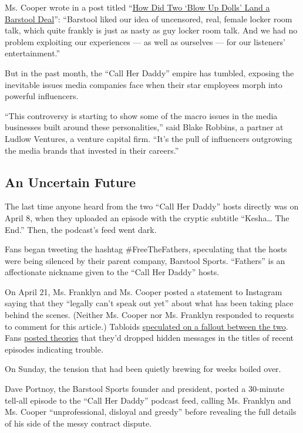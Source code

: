 Ms. Cooper wrote in a post titled
``\href{https://www.barstoolsports.com/blog/1108118/how-did-two-blow-up-dolls-land-a-barstool-deal}{How
Did Two `Blow Up Dolls' Land a Barstool Deal}'': ``Barstool liked our
idea of uncensored, real, female locker room talk, which quite frankly
is just as nasty as guy locker room talk. And we had no problem
exploiting our experiences --- as well as ourselves --- for our
listeners' entertainment.''

But in the past month, the ``Call Her Daddy'' empire has tumbled,
exposing the inevitable issues media companies face when their star
employees morph into powerful influencers.

``This controversy is starting to show some of the macro issues in the
media businesses built around these personalities,'' said Blake Robbins,
a partner at Ludlow Ventures, a venture capital firm. ``It's the pull of
influencers outgrowing the media brands that invested in their
careers.''

\hypertarget{an-uncertain-future}{%
\subsection{An Uncertain Future}\label{an-uncertain-future}}

The last time anyone heard from the two ``Call Her Daddy'' hosts
directly was on April 8, when they uploaded an episode with the cryptic
subtitle ``Kesha\ldots{} The End.'' Then, the podcast's feed went dark.

Fans began tweeting the hashtag \#FreeTheFathers, speculating that the
hosts were being silenced by their parent company, Barstool Sports.
``Fathers'' is an affectionate nickname given to the ``Call Her Daddy''
hosts.

On April 21, Ms. Franklyn and Ms. Cooper posted a statement to Instagram
saying that they ``legally can't speak out yet'' about what has been
taking place behind the scenes. (Neither Ms. Cooper nor Ms. Franklyn
responded to requests to comment for this article.) Tabloids
\href{https://pagesix.com/2020/04/27/battle-brewing-between-barstool-sports-and-raunchy-hit-podcast-call-her-daddy/}{speculated
on a fallout between the two}. Fans
\href{https://twtext.com/article/1254463034522820610}{posted theories}
that they'd dropped hidden messages in the titles of recent episodes
indicating trouble.

On Sunday, the tension that had been quietly brewing for weeks boiled
over.

Dave Portnoy, the Barstool Sports founder and president, posted a
30-minute tell-all episode to the ``Call Her Daddy'' podcast feed,
calling Ms. Franklyn and Ms. Cooper ``unprofessional, disloyal and
greedy'' before revealing the full details of his side of the messy
contract dispute.

